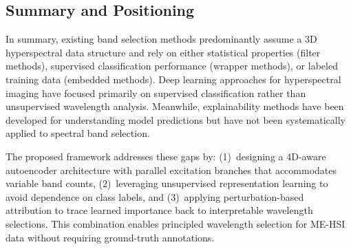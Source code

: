 \subsection{Summary and Positioning}
\label{sec:related_summary}

In summary, existing band selection methods predominantly assume a 3D hyperspectral data structure and rely on either statistical properties (filter methods), supervised classification performance (wrapper methods), or labeled training data (embedded methods).
Deep learning approaches for hyperspectral imaging have focused primarily on supervised classification rather than unsupervised wavelength analysis.
Meanwhile, explainability methods have been developed for understanding model predictions but have not been systematically applied to spectral band selection.

The proposed framework addresses these gaps by: (1)~designing a 4D-aware autoencoder architecture with parallel excitation branches that accommodates variable band counts, (2)~leveraging unsupervised representation learning to avoid dependence on class labels, and (3)~applying perturbation-based attribution to trace learned importance back to interpretable wavelength selections.
This combination enables principled wavelength selection for ME-HSI data without requiring ground-truth annotations.